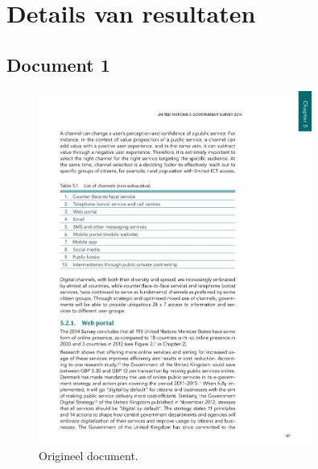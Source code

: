 
\chapter{Details van resultaten}
\label{ch:details-van-resultaten}

\newpage

\section{Document 1}

\begin{figure}[H]
    \centering
    \includegraphics[width=0.8\textwidth]{test-resultaten/1/original.jpg}
    \caption{Origineel document.}
\end{figure}


